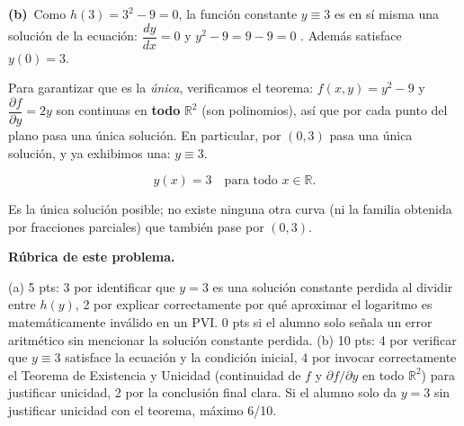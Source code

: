 \documentclass[11pt,letterpaper]{article}
\newcommand{\subparte}[2]{%
  \medskip\noindent\textbf{(#1}\ #2\par\smallskip
}
\newenvironment{resultado}
  {\begin{mdframed}[linecolor=black,linewidth=0.6pt,
    innerleftmargin=6pt,innerrightmargin=6pt,innertopmargin=4pt,innerbottommargin=4pt]
   \bfseries}
  {\end{mdframed}}
\newenvironment{rubrica}{%
  \begin{mdframed}[linecolor=black,linewidth=0.6pt,
    innerleftmargin=8pt,innerrightmargin=8pt,innertopmargin=5pt,innerbottommargin=5pt]
  \small\textbf{Rúbrica de este problema.}\par\smallskip
}{\end{mdframed}}
\begin{document}
\subparte{b)}{Como $h(3)=3^2-9=0$, la función constante $y\equiv 3$ es en sí misma una solución de la ecuación: $\dfrac{dy}{dx}=0$ y $y^2-9=9-9=0$ \checkmark. Además satisface $y(0)=3$.

Para garantizar que es la \emph{única}, verificamos el teorema: $f(x,y)=y^2-9$ y $\dfrac{\partial f}{\partial y}=2y$ son continuas en \textbf{todo} $\mathbb{R}^2$ (son polinomios), así que por cada punto del plano pasa una única solución. En particular, por $(0,3)$ pasa una única solución, y ya exhibimos una: $y\equiv3$.
\begin{resultado}
\[
y(x) = 3 \quad \text{para todo } x \in \mathbb{R}.
\]
\end{resultado}
Es la única solución posible; no existe ninguna otra curva (ni la familia obtenida por fracciones parciales) que también pase por $(0,3)$.}

\begin{rubrica}
(a) 5 pts: 3 por identificar que $y=3$ es una solución constante perdida al dividir entre $h(y)$, 2 por explicar correctamente por qué aproximar el logaritmo es matemáticamente inválido en un PVI. 0 pts si el alumno solo señala un error aritmético sin mencionar la solución constante perdida. (b) 10 pts: 4 por verificar que $y\equiv3$ satisface la ecuación y la condición inicial, 4 por invocar correctamente el Teorema de Existencia y Unicidad (continuidad de $f$ y $\partial f/\partial y$ en todo $\mathbb{R}^2$) para justificar unicidad, 2 por la conclusión final clara. Si el alumno solo da $y=3$ sin justificar unicidad con el teorema, máximo 6/10.
\end{rubrica}
\end{document}
